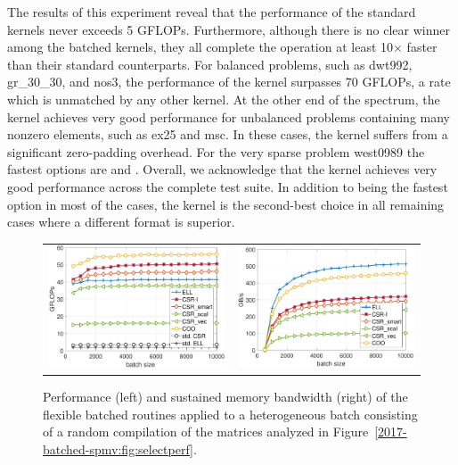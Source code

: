 The results of this experiment reveal
that the performance of the standard \spmv kernels never exceeds 5 GFLOPs.
Furthermore, although there is no clear winner among the batched \spmv kernels, 
they
all complete the operation at least 10$\times$ faster than their standard 
counterparts. 
For balanced problems, such as {\sc dwt992}, {\sc gr\_30\_30}, and {\sc nos3},
the performance of the \ell kernel surpasses 70 GFLOPs, a rate which is 
unmatched by any other kernel.
At the other end of the spectrum, the \csri kernel achieves very good 
performance for unbalanced
problems containing many nonzero elements, such as {\sc ex25} and {\sc msc}.
In these cases, the \ell kernel suffers from a significant zero-padding 
overhead.
For the very sparse problem {\sc west0989} the fastest options are \csrscal and 
\coo.
Overall, we acknowledge that the \coo kernel achieves very good performance 
across the complete test suite. In addition to being the fastest option in most 
of the cases, the \coo kernel
is the second-best choice in all remaining cases where a different format is 
superior.

\begin{figure}
	\begin{center}
		\begin{tabular}{cc}
			\includegraphics[width=.45\columnwidth]{plots/RND_UNITSIZE_GFLOPS}
			&
			\includegraphics[width=.45\columnwidth]{plots/RND_UNITSIZE_BW}\\
		\end{tabular}
	\end{center}
	\caption{Performance (left) and sustained memory bandwidth (right) of the 
		flexible batched \spmv routines
		applied to a heterogeneous batch consisting of a random compilation of 
		the 
		matrices analyzed in Figure~\ref{2017-batched-spmv:fig:selectperf}.
	}
	\label{2017-batched-spmv:fig:similarsize}
\end{figure}

